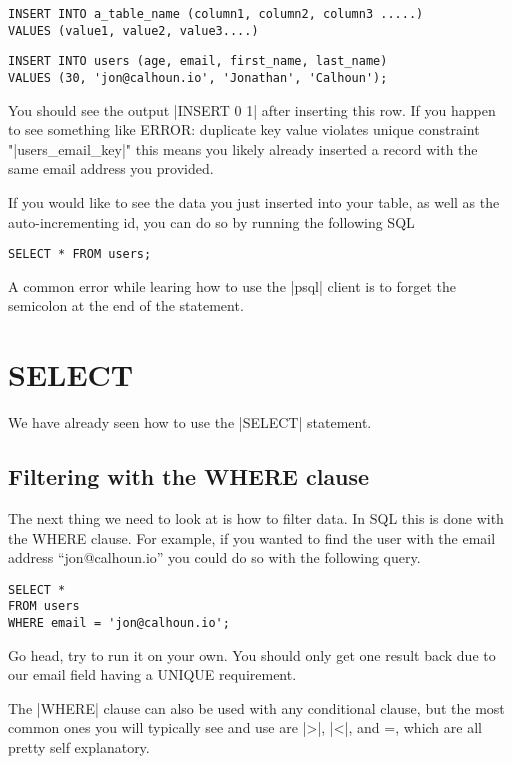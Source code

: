 \begin{verbatim}
INSERT INTO a_table_name (column1, column2, column3 .....) 
VALUES (value1, value2, value3....) 
\end{verbatim}

\begin{verbatim}
INSERT INTO users (age, email, first_name, last_name)
VALUES (30, 'jon@calhoun.io', 'Jonathan', 'Calhoun');
\end{verbatim}

You should see the output |INSERT 0 1| after inserting this row. If you happen to see something like ERROR: duplicate key value violates unique constraint "|users_email_key|" this means you likely already inserted a record with the same email address you provided.

If you would like to see the data you just inserted into your table, as well as the auto-incrementing id, you can do so by running the following SQL

\begin{verbatim}
SELECT * FROM users;
\end{verbatim}

A common error while learing how to use the |psql| client is to forget the semicolon at the end of the statement. 

\section{SELECT}

We have already seen how to use the |SELECT| statement. 

\subsection{Filtering with the WHERE clause}

The next thing we need to look at is how to filter data. In SQL this is done with the WHERE clause. For example, if you wanted to find the user with the email address “jon@calhoun.io” you could do so with the following query.

\begin{verbatim}
SELECT *
FROM users
WHERE email = 'jon@calhoun.io';
\end{verbatim}


Go head, try to run it on your own. You should only get one result back due to our email field having a UNIQUE requirement.

The |WHERE| clause can also be used with any conditional clause, but the most common ones you will typically see and use are |>|, |<|, and =, which are all pretty self explanatory.


